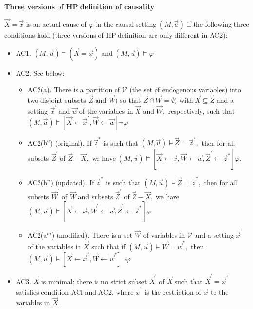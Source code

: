 \documentclass{article}
\begin{document}
\begin{mdframed}
\textbf{Three versions of HP definition of causality}
	
	$\vec{X}=\vec{x}$ is an actual cause of $\varphi$ in the causal setting $(M, \vec{u})$ if the following three conditions hold (three versions of HP definition are only different in AC2):

	\begin{itemize}
		\item AC1. $(M, \vec{u})\models(\vec{X}=\vec{x})$ and $(M, \vec{u})\models\varphi$
		\item AC2. See below:
		\begin{itemize}
		\item AC2(a). There is a partition of $\mathcal{V}$ (the set of endogenous variables) into two disjoint subsets $\vec{Z}$ and $\vec{W}($ so that $\vec{Z} \cap \vec{W}=\emptyset)$ with $\vec{X} \subseteq \vec{Z}$ and a setting $\vec{x}^{\prime}$ and $\vec{w}$ of the variables in $\vec{X}$ and $\vec{W},$ respectively, such that $(M, \vec{u})\models[\vec{X} \leftarrow \vec{x}^{\prime}, \vec{W} \leftarrow \vec{w}] \neg \varphi$
		\item AC2($\mathrm{b}^{o}$) (original). If $\vec{z}^{*}$ is such that $(M, \vec{u}) \models \vec{Z}=\vec{z}^{*},$ then for all subsets $\vec{Z}^{\prime}$ of $\vec{Z}-\vec{X},$ we have $(M, \vec{u})\models[\vec{X} \leftarrow \vec{x}, \vec{W} \leftarrow \vec{w}, \vec{Z}^{\prime} \leftarrow \vec{z}^{*}] \varphi$.
		\item AC2($\mathrm{b}^{u}$) (updated). If $\vec{z}^{*}$ is such that $(M, \vec{u})\models\vec{Z}=\vec{z}^{*},$ then for all subsets $\vec{W}^{\prime}$ of $\vec{W}$ and subsets $\vec{Z}^{\prime}$ of $\vec{Z}-\vec{X},$ we have $(M, \vec{u})\models[\vec{X} \leftarrow \vec{x}, \vec{W}^{\prime} \leftarrow \vec{w}, \vec{Z}^{\prime} \leftarrow \vec{z}^{*}] \varphi$
		\item AC2($\mathrm{a}^{m}$) (modified). There is a set $\vec{W}$ of variables in $\mathcal{V}$ and a setting $\vec{x}^{\prime}$ of the variables in $\vec{X}$ such that if $(M, \vec{u})\models\vec{W}=\vec{w}^{*},$ then $(M, \vec{u})\models[\vec{X} \leftarrow \vec{x}^{\prime}, \vec{W} \leftarrow \vec{w}^{*}] \neg \varphi$
		\end{itemize}
		\item AC3. $\vec{X}$ is minimal; there is no strict subset $\vec{X}^{\prime}$ of $\vec{X}$ such that $\vec{X}^{\prime}=\vec{x}^{\prime}$ satisfies condition
		ACl and AC2, where $\vec{x}^{\prime}$ is the restriction of $\vec{x}$ to the variables in $\vec{X}$ .
	\end{itemize}
	
\end{mdframed}
\end{document}
